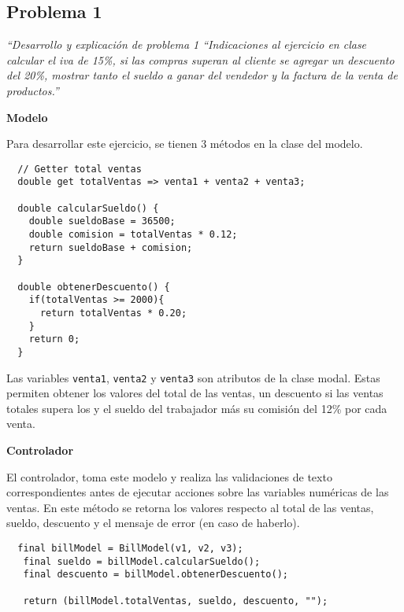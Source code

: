 \subsection{Problema 1}

\textit {“Desarrollo y explicación de problema 1 “Indicaciones al ejercicio en clase calcular el iva de 15\%, si las compras superan  al cliente se agregar un descuento del 20\%, mostrar tanto el sueldo a ganar del vendedor y la factura de la venta de productos.”}

\textbf{Modelo}

Para desarrollar este ejercicio, se tienen 3 métodos en la clase del modelo.

\begin{center}
\begin{lstlisting}
  // Getter total ventas
  double get totalVentas => venta1 + venta2 + venta3;

  double calcularSueldo() {
    double sueldoBase = 36500;
    double comision = totalVentas * 0.12;
    return sueldoBase + comision;
  }

  double obtenerDescuento() {
    if(totalVentas >= 2000){
      return totalVentas * 0.20;
    }
    return 0;
  }
\end{lstlisting}
\end{center}

Las variables \lstinline{venta1}, \lstinline{venta2} y \lstinline{venta3} son atributos de la clase modal. Estas permiten obtener los valores del total de las ventas, un descuento si las ventas totales supera los  y el sueldo del trabajador más su comisión del 12\% por cada venta.

\textbf{Controlador}

El controlador, toma este modelo y realiza las validaciones de texto correspondientes antes de ejecutar acciones sobre las variables numéricas de las ventas. En este método se retorna los valores respecto al total de las ventas, sueldo, descuento y el mensaje de error (en caso de haberlo).

\begin{center}
\begin{lstlisting}
  final billModel = BillModel(v1, v2, v3);
   final sueldo = billModel.calcularSueldo();
   final descuento = billModel.obtenerDescuento();

   return (billModel.totalVentas, sueldo, descuento, "");
\end{lstlisting}
\end{center}

